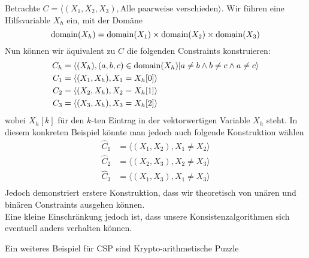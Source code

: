 \begin{beispiel}
	Betrachte $C = \langle(X_1,X_2,X_3), \text{Alle paarweise verschieden}\rangle$. Wir führen eine Hilfsvariable $X_h$ ein, mit der Domäne
$$
	\operatorname{domain}(X_h) = \operatorname{domain}(X_1)\times \operatorname{domain}(X_2)\times\operatorname{domain}(X_3)
$$
	Nun können wir äquivalent zu $C$ die folgenden Constraints konstruieren:
\begin{align*}
	C_h &= \langle(X_h), (a,b,c)\in \operatorname{domain}(X_h) | a\neq b \wedge b \neq c \wedge a \neq c\rangle \\
	C_1 &= \langle(X_1,X_h), X_1 = X_h[0]\rangle \\
	C_2 &= \langle(X_2,X_h), X_2 = X_h[1]\rangle \\
	C_3 &= \langle(X_3,X_h), X_3 = X_h[2]\rangle
\end{align*}
wobei $X_h[k]$ für den $k$-ten Eintrag in der vektorwertigen Variable $X_h$ steht. In diesem konkreten Beispiel könnte man jedoch auch folgende Konstruktion wählen
\begin{align*}
	\hat{C}_1 &= \langle(X_1,X_2),X_1\neq X_2\rangle \\
	\hat{C}_2 &= \langle(X_2,X_3),X_2\neq X_3\rangle \\
	\hat{C}_3 &= \langle(X_1,X_3),X_1\neq X_3\rangle \\
\end{align*}
Jedoch demonstriert erstere Konstruktion, dass wir theoretisch von unären und binären Constraints ausgehen können. \\
Eine kleine Einschränkung jedoch ist, dass unsere Konsistenzalgorithmen sich eventuell anders verhalten können.

\end{beispiel}
Ein weiteres Beispiel für CSP sind Krypto-arithmetische Puzzle
